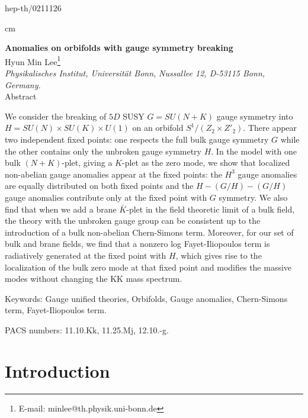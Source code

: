 \documentclass[a4paper,12pt]{article}
\begin{document}
%
%
\begin{flushright}
hep-th/0211126
\end{flushright}
 cm
\begin{center}
{\Large {\bf
Anomalies on orbifolds with gauge symmetry breaking
}
}
\\[0pt]

\vskip 1.5cm
Hyun Min Lee\footnote{E-mail: minlee@th.physik.uni-bonn.de}
\\[0pt]
\vspace{0.23cm}
{\it  Physikalisches Institut, Universit\"at Bonn,}
{\it Nussallee 12, D-53115 Bonn, Germany.}\\
\bigskip
\vspace{3.4cm} Abstract\\[2ex]
\end{center}
We consider the breaking of $5D$ SUSY $G=SU(N+K)$ gauge symmetry
into $H=SU(N)\times SU(K)\times U(1)$ on an orbifold $S^1/(Z_2\times
Z'_2)$. There appear two independent fixed points: one respects
the full bulk gauge symmetry $G$ while the other contains only the
unbroken gauge symmetry $H$. In the model with one bulk $(N+K)$-plet,
giving a $K$-plet as the zero mode, we show that
localized non-abelian gauge anomalies appear at the fixed points: 
the $H^3$ gauge anomalies are equally distributed on
both fixed points and the $H-(G/H)-(G/H)$ gauge anomalies
contribute only at the fixed point with $G$ symmetry. 
We also find that when we add a brane $\bar K$-plet 
in the field theoretic limit of a bulk field, 
the theory with the unbroken
gauge group can be consistent up to the introduction of a bulk non-abelian 
Chern-Simons term. Moreover, for our set of bulk and brane fields, 
we find that  
a nonzero log Fayet-Iliopoulos term is radiatively generated 
at the fixed point with $H$, which gives rise to
the localization of the bulk zero mode at that fixed point and modifies 
the massive modes without changing the KK mass spectrum.

\vskip 1cm
\noindent Keywords: Gauge unified theories, Orbifolds, Gauge anomalies, 
Chern-Simons term, Fayet-Iliopoulos term.

\noindent PACS numbers: 11.10.Kk, 11.25.Mj, 12.10.-g.
\newpage

\section{Introduction}
\end{document}
